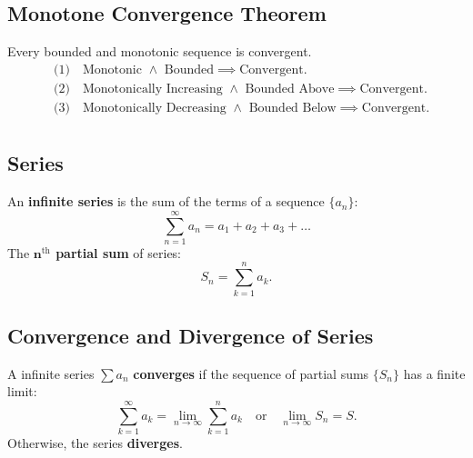 \documentclass[a4paper,11pt]{article}
\theoremstyle{definition}
\theoremstyle{plain}
\theoremstyle{remark}
\begin{document}


\subsection{Monotone Convergence Theorem}

\begin{tcolorbox}
    Every bounded and monotonic sequence is convergent.
    \[
    \begin{aligned}
        &\text{(1)} \quad \text{Monotonic } \land \text{ Bounded} 
        \implies \text{Convergent}. \\[8pt]
        &\text{(2)} \quad \text{Monotonically Increasing } \land \text{ Bounded Above} 
        \implies \text{Convergent}. \\[8pt]
        &\text{(3)} \quad \text{Monotonically Decreasing } \land \text{ Bounded Below} 
        \implies \text{Convergent}. \\[8pt]
    \end{aligned}
    \]
\end{tcolorbox}




\subsection{Series}

\begin{tcolorbox}
    An \textbf{infinite series} is the sum of the terms of a sequence $\{a_n\}$:
    \[
    \sum_{n=1}^{\infty} a_n = a_1 + a_2 + a_3 + \dots
    \]
    The \textbf{$\boldsymbol{n}^\text{th}$ partial sum} of series:
    \[
    S_n = \sum_{k=1}^{n} a_k.
    \]
\end{tcolorbox}




\subsection{Convergence and Divergence of Series}

\begin{tcolorbox}
    A infinite series $\textstyle \sum a_n$ \textbf{converges} if the sequence of partial sums $\{ S_n \}$ has a finite limit:
    \[
    \sum_{k=1}^{\infty} a_k = \lim_{n \to \infty} \sum_{k=1}^{n} a_k \quad \text{or} \quad \lim_{n \to \infty} S_n = S.
    \]
    Otherwise, the series \textbf{diverges}.
\end{tcolorbox}
\end{document}
